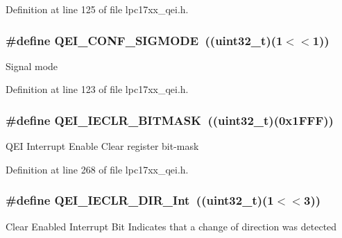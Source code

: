 \-Definition at line 125 of file lpc17xx\-\_\-qei.\-h.

\hypertarget{group___q_e_i___private___macros_ga6234063e1c9d7a5e6fbc0fa294fe1c5f}{
\subsubsection[{\-Q\-E\-I\-\_\-\-C\-O\-N\-F\-\_\-\-S\-I\-G\-M\-O\-D\-E}]{\setlength{\rightskip}{0pt plus 5cm}\#define {\bf \-Q\-E\-I\-\_\-\-C\-O\-N\-F\-\_\-\-S\-I\-G\-M\-O\-D\-E}~((uint32\-\_\-t)(1$<$$<$1))}}\label{group___q_e_i___private___macros_ga6234063e1c9d7a5e6fbc0fa294fe1c5f}
\-Signal mode 

\-Definition at line 123 of file lpc17xx\-\_\-qei.\-h.

\hypertarget{group___q_e_i___private___macros_ga33263ceacbb52f1ab67b9051db1a6322}{
\subsubsection[{\-Q\-E\-I\-\_\-\-I\-E\-C\-L\-R\-\_\-\-B\-I\-T\-M\-A\-S\-K}]{\setlength{\rightskip}{0pt plus 5cm}\#define {\bf \-Q\-E\-I\-\_\-\-I\-E\-C\-L\-R\-\_\-\-B\-I\-T\-M\-A\-S\-K}~((uint32\-\_\-t)(0x1\-F\-F\-F))}}\label{group___q_e_i___private___macros_ga33263ceacbb52f1ab67b9051db1a6322}
\-Q\-E\-I \-Interrupt \-Enable \-Clear register bit-\/mask 

\-Definition at line 268 of file lpc17xx\-\_\-qei.\-h.

\hypertarget{group___q_e_i___private___macros_ga05607ea447c290086d38a654a3822864}{
\subsubsection[{\-Q\-E\-I\-\_\-\-I\-E\-C\-L\-R\-\_\-\-D\-I\-R\-\_\-\-Int}]{\setlength{\rightskip}{0pt plus 5cm}\#define {\bf \-Q\-E\-I\-\_\-\-I\-E\-C\-L\-R\-\_\-\-D\-I\-R\-\_\-\-Int}~((uint32\-\_\-t)(1$<$$<$3))}}\label{group___q_e_i___private___macros_ga05607ea447c290086d38a654a3822864}
\-Clear \-Enabled \-Interrupt \-Bit \-Indicates that a change of direction was detected 


